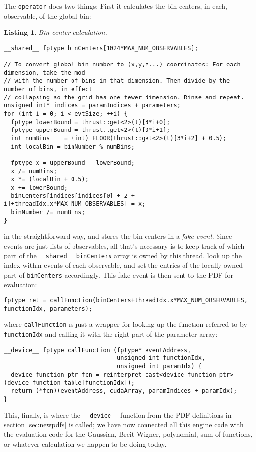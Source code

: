 \documentclass[12pt,pdflatex]{article}
\newtheorem{listing}{Listing}
\begin{document}
The \texttt{operator} does two things: First it calculates the bin centers,
in each, observable, of the global bin:
\begin{listing}
\label{listing:bincenter}
Bin-center calculation.

\begin{verbatim}
__shared__ fptype binCenters[1024*MAX_NUM_OBSERVABLES];

// To convert global bin number to (x,y,z...) coordinates: For each dimension, take the mod 
// with the number of bins in that dimension. Then divide by the number of bins, in effect
// collapsing so the grid has one fewer dimension. Rinse and repeat. 
unsigned int* indices = paramIndices + parameters;
for (int i = 0; i < evtSize; ++i) {
  fptype lowerBound = thrust::get<2>(t)[3*i+0];
  fptype upperBound = thrust::get<2>(t)[3*i+1];
  int numBins    = (int) FLOOR(thrust::get<2>(t)[3*i+2] + 0.5); 
  int localBin = binNumber % numBins;

  fptype x = upperBound - lowerBound; 
  x /= numBins;
  x *= (localBin + 0.5); 
  x += lowerBound;
  binCenters[indices[indices[0] + 2 + i]+threadIdx.x*MAX_NUM_OBSERVABLES] = x; 
  binNumber /= numBins;
}
\end{verbatim}
\end{listing}
in the straightforward way, and stores the bin centers in a \emph{fake event}.
Since events are just lists of observables, all that's necessary is to keep track
of which part of the \verb|__shared__| \texttt{binCenters} array is owned by this
thread, look up the index-within-events of each observable, and set the entries
of the locally-owned part of \texttt{binCenters} accordingly. This fake event is then
sent to the PDF for evaluation:
\begin{verbatim}
fptype ret = callFunction(binCenters+threadIdx.x*MAX_NUM_OBSERVABLES, functionIdx, parameters); 
\end{verbatim}
where \texttt{callFunction} is just a wrapper for looking up the function referred to
by \texttt{functionIdx} and calling it with the right part of the parameter array:
\begin{verbatim}
__device__ fptype callFunction (fptype* eventAddress, 
                                unsigned int functionIdx, 
                                unsigned int paramIdx) {
  device_function_ptr fcn = reinterpret_cast<device_function_ptr>(device_function_table[functionIdx]);
  return (*fcn)(eventAddress, cudaArray, paramIndices + paramIdx);
}
\end{verbatim}
This, finally, is where the \verb|__device__| function from the PDF definitions
in section \ref{sec:newpdfs} is called; we have now connected all this engine
code with the evaluation code for the Gaussian, Breit-Wigner, polynomial, sum of
functions, or whatever calculation we happen to be doing today. 
\end{document}
